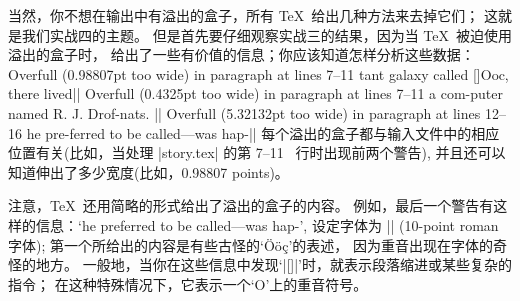 当然，你不想在输出中有溢出的盒子，所有 \TeX\ 给出几种方法来去掉它们；
这就是我们实战四的主题。%
但是首先要仔细观察实战三的结果，因为当 \TeX\ 被迫使用溢出的盒子时，
给出了一些有价值的信息；你应该知道怎样分析这些数据：
\begintt
Overfull \hbox (0.98807pt too wide) in paragraph at lines 7--11
\tenrm tant galaxy called []O^^?o^^Xc, there lived||
Overfull \hbox (0.4325pt too wide) in paragraph at lines 7--11
\tenrm a com-puter named R. J. Drof-nats. ||
Overfull \hbox (5.32132pt too wide) in paragraph at lines 12--16
\tenrm he pre-ferred to be called---was hap-||
\endtt
每个溢出的盒子都与输入文件中的相应位置有关(比如，当处理 |story.tex| 的第 7--11~%
行时出现前两个警告), 并且还可以知道伸出了多少宽度(比如，0.98807 points)。

\1注意，\TeX\ 还用简略的形式给出了溢出的盒子的内容。%
例如，最后一个警告有这样的信息：`he preferred
to be called---was hap-', 设定字体为 |\tenrm| (10-point roman 字体);
第一个所给出的内容是有些古怪的`\"O\"o\c c'的表述，
因为重音出现在字体的奇怪的地方。%
一般地，当你在这些信息中发现`|[]|'时，就表示段落缩进或某些复杂的指令；
在这种特殊情况下，它表示一个`O'上的重音符号。

